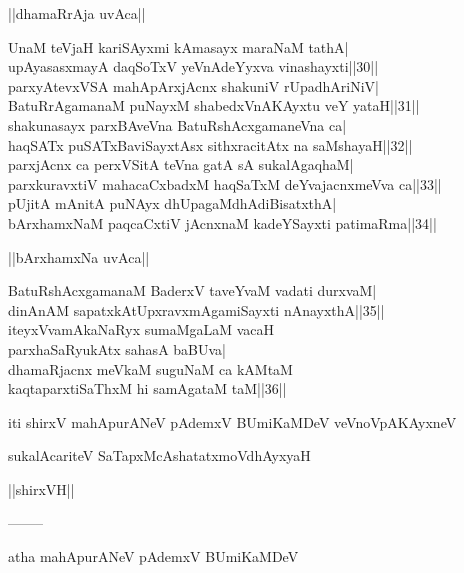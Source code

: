 \documentclass{article}
\begin{document}
\begin{center}
||dhamaRrAja uvAca||
\end{center}

UnaM teVjaH kariSAyxmi kAmasayx maraNaM tathA|\\
upAyasasxmayA daqSoTxV yeVnAdeYyxva vinashayxti||30||\\
parxyAtevxVSA mahApArxjAcnx shakuniV rUpadhAriNiV|\\
BatuRrAgamanaM puNayxM shabedxVnAKAyxtu veY yataH||31||\\
shakunasayx parxBAveVna BatuRshAcxgamaneVna ca|\\
haqSATx puSATxBaviSayxtAsx sithxracitAtx na saMshayaH||32||\\
parxjAcnx ca perxVSitA teVna gatA sA sukalAgaqhaM|\\
parxkuravxtiV mahacaCxbadxM haqSaTxM deYvajacnxmeVva ca||33||\\
pUjitA mAnitA puNAyx dhUpagaMdhAdiBisatxthA|\\
bArxhamxNaM paqcaCxtiV jAcnxnaM kadeYSayxti patimaRma||34||\\

\begin{center}
||bArxhamxNa uvAca||
\end{center}

BatuRshAcxgamanaM BaderxV taveYvaM vadati durxvaM|\\
dinAnAM sapatxkAtUpxravxmAgamiSayxti nAnayxthA||35||\\
iteyxVvamAkaNaRyx sumaMgaLaM vacaH\\
parxhaSaRyukAtx sahasA baBUva|\\
dhamaRjacnx meVkaM suguNaM ca kAMtaM\\
kaqtaparxtiSaThxM hi samAgataM taM||36||

\begin{center}
iti shirxV mahApurANeV pAdemxV BUmiKaMDeV veVnoVpAKAyxneV
\end{center}

\begin{center}
sukalAcariteV SaTapxMcAshatatxmoVdhAyxyaH
\end{center}

\begin{center}
||shirxVH||
\end{center}

\begin{center}
--------
\end{center}

\begin{center}
atha mahApurANeV pAdemxV BUmiKaMDeV
\end{center}
\end{document}
